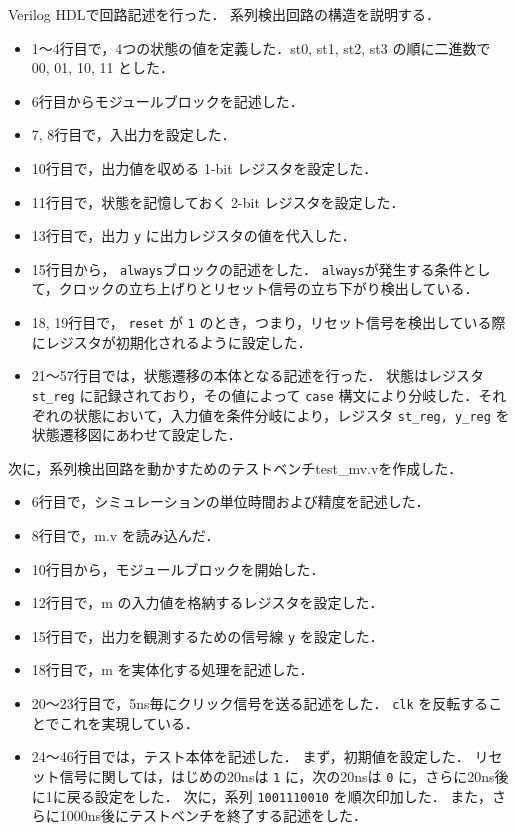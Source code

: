 \documentclass[uplatex]{jsarticle}
\begin{document}
Verilog HDLで回路記述を行った．
系列検出回路の構造を説明する．

\begin{itemize}
  \item 1〜4行目で，4つの状態の値を定義した．st0, st1, st2, st3 の順に二進数で 00, 01, 10, 11 とした．
  \item 6行目からモジュールブロックを記述した．
  \item 7, 8行目で，入出力を設定した．
  \item 10行目で，出力値を収める 1-bit レジスタを設定した．
  \item 11行目で，状態を記憶しておく 2-bit レジスタを設定した．
  \item 13行目で，出力 {\tt y} に出力レジスタの値を代入した．
  \item 
    15行目から， {\tt always}ブロックの記述をした．
    {\tt always}が発生する条件として，クロックの立ち上げりとリセット信号の立ち下がり検出している．
  \item 18, 19行目で， {\tt reset} が {\tt 1} のとき，つまり，リセット信号を検出している際にレジスタが初期化されるように設定した．
  \item 
    21〜57行目では，状態遷移の本体となる記述を行った．
    状態はレジスタ {\tt st\_reg} に記録されており，その値によって {\tt case} 構文により分岐した．それぞれの状態において，入力値を条件分岐により，レジスタ {\tt st\_reg, y\_reg} を状態遷移図にあわせて設定した．
\end{itemize}

次に，系列検出回路を動かすためのテストベンチtest\_mv.vを作成した．

\begin{itemize}
  \item 6行目で，シミュレーションの単位時間および精度を記述した．
  \item 8行目で，m.v を読み込んだ．
  \item 10行目から，モジュールブロックを開始した．
  \item 12行目で，m の入力値を格納するレジスタを設定した．
  \item 15行目で，出力を観測するための信号線 {\tt y} を設定した．
  \item 18行目で，m を実体化する処理を記述した．
  \item 20〜23行目で，5ns毎にクリック信号を送る記述をした． {\tt clk} を反転することでこれを実現している．
  \item
    24〜46行目では，テスト本体を記述した．
    まず，初期値を設定した．
    リセット信号に関しては，はじめの20nsは {\tt 1} に，次の20nsは {\tt 0} に，さらに20ns後に1に戻る設定をした．
    次に，系列 {\tt 1001110010} を順次印加した．
    また，さらに1000ns後にテストベンチを終了する記述をした． 
\end{itemize}
\end{document}
